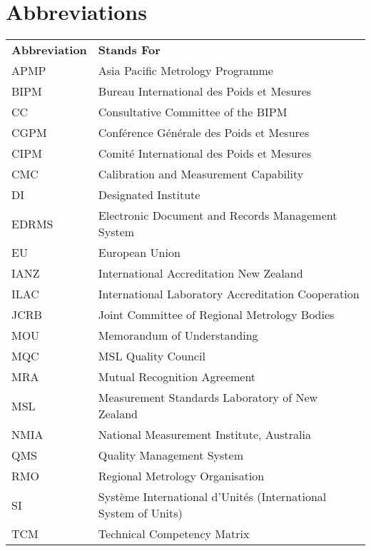 \section{Abbreviations}
\begin{center}
{\renewcommand*{\arraystretch}{1.4}
\begin{tabular}{p{14.07em}p{25em}}
	\rowcolor[rgb]{ 0,  0,  0} 
	\textcolor[rgb]{ 1,  1,  1}{\textbf{Abbreviation}} & 
	\textcolor[rgb]{ 1,  1,  1}{\textbf{Stands For}} \\
APMP & Asia Pacific Metrology Programme \\ 
BIPM & Bureau International des Poids et Mesures \\ 
CC & Consultative Committee of the BIPM \\ 
CGPM & Conf\'erence G\'en\'erale des Poids et Mesures \\ 
CIPM & Comit\'e International des Poids et Mesures \\
CMC & Calibration and Measurement Capability \\
DI & Designated Institute \\
EDRMS & Electronic Document and Records Management System \\
EU & European Union \\
IANZ & International Accreditation New Zealand \\
ILAC & International Laboratory Accreditation Cooperation \\
JCRB & Joint Committee of Regional Metrology Bodies \\
MOU & Memorandum of Understanding \\
MQC & MSL Quality Council \\
MRA & Mutual Recognition Agreement \\
MSL & Measurement Standards Laboratory of New Zealand \\
NMIA & National Measurement Institute, Australia \\
QMS & Quality Management System \\
RMO & Regional Metrology Organisation \\
SI & Système International d'Unités (International System of Units) \\
TCM & Technical Competency Matrix \\
\hline 
\end{tabular} 
}
\end{center}
